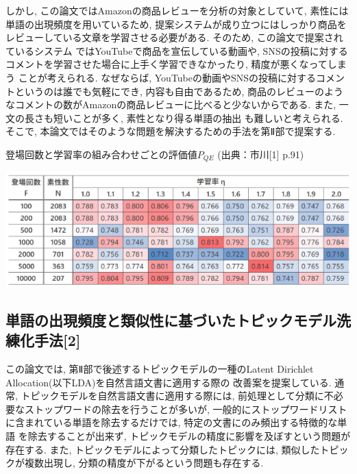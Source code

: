 \documentclass{ltjarticle}
\begin{document}
しかし, この論文ではAmazonの商品レビューを分析の対象としていて, 素性には単語の出現頻度を用いているため, 
提案システムが成り立つにはしっかり商品をレビューしている文章を学習させる必要がある. そのため, この論文で提案されているシステム
ではYouTubeで商品を宣伝している動画や, SNSの投稿に対するコメントを学習させた場合に上手く学習できなかったり, 精度が悪くなってしまう
ことが考えられる. なぜならば, YouTubeの動画やSNSの投稿に対するコメントというのは誰でも気軽にでき, 内容も自由であるため, 
商品のレビューのようなコメントの数がAmazonの商品レビューに比べると少ないからである. また, 一文の長さも短いことが多く, 素性となり得る単語の抽出
も難しいと考えられる. そこで, 本論文ではそのような問題を解決するための手法を第Ⅱ部で提案する.
\begin{table}
    \centering
    \caption{登場回数と学習率の組み合わせごとの評価値$P_{QE}$ (出典：市川[1] p.91)}
    \includegraphics[width=14cm]{images/table1.png}
    \label{table:関連研究1結果}
\end{table}

\subsection{単語の出現頻度と類似性に基づいたトピックモデル洗練化手法[2]}
この論文では, 第Ⅱ部で後述するトピックモデルの一種のLatent Dirichlet Allocation(以下LDA)を自然言語文書に適用する際の
改善案を提案している. 
通常, トピックモデルを自然言語文書に適用する際には, 前処理として分類に不必要なストップワードの除去を行うことが多いが, 
一般的にストップワードリストに含まれている単語を除去するだけでは, 特定の文書にのみ頻出する特徴的な単語
を除去することが出来ず, トピックモデルの精度に影響を及ぼすという問題が存在する. 
また, トピックモデルによって分類したトピックには, 類似したトピックが複数出現し, 
分類の精度が下がるという問題も存在する. 
\end{document}
